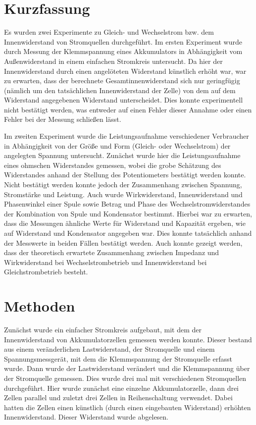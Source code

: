 \documentclass[
	a4paper,
	12pt,
	pagesize,
	ngerman
]{scrartcl}
\begin{document}
	\section{Kurzfassung}
	Es wurden zwei Experimente zu Gleich- und Wechselstrom bzw. dem Innenwiderstand von Stromquellen durchgeführt.
	Im ersten Experiment wurde durch Messung der Klemmspannung eines Akkumulators in Abhängigkeit vom Außenwiderstand in einem einfachen Stromkreis untersucht.
	Da hier der Innenwiderstand durch einen angelöteten Widerstand künstlich erhöht war, war zu erwarten, dass der berechnete Gesamtinnenwiderstand sich nur geringfügig (nämlich um den tatsächlichen Innenwiderstand der Zelle) von dem auf dem Widerstand angegebenen Widerstand unterscheidet.
	Dies konnte experimentell nicht bestätigt werden, was entweder auf einen Fehler dieser Annahme oder einen Fehler bei der Messung schließen lässt.
	\par 
	Im zweiten Experiment wurde die Leistungsaufnahme verschiedener Verbraucher in Abhängigkeit von der Größe und Form (Gleich- oder Wechselstrom) der angelegten Spannung untersucht.
	Zunächst wurde hier die Leistungsaufnahme eines ohmschen Widerstandes gemessen, wobei die grobe Schätzung des Widerstandes anhand der Stellung des Potentiometers bestätigt werden konnte.
	Nicht bestätigt werden konnte jedoch der Zusammenhang zwischen Spannung, Stromstärke und Leistung.
	Auch wurde Wirkwiderstand, Innenwiderstand und Phasenwinkel einer Spule sowie Betrag und Phase des Wechselstromwiderstandes der Kombination von Spule und Kondensator bestimmt.
	Hierbei war zu erwarten, dass die Messungen ähnliche Werte für Widerstand und Kapazität ergeben, wie auf Widerstand und Kondensator angegeben war.
	Dies konnte tatsächlich anhand der Messwerte in beiden Fällen bestätigt werden.
	Auch konnte gezeigt werden, dass der theoretisch erwartete Zusammenhang zwischen Impedanz und Wirkwiderstand bei Wechselstrombetrieb und Innenwiderstand bei Gleichstrombetrieb besteht.
	
	\section{Methoden}
	Zunächst wurde ein einfacher Stromkreis aufgebaut, mit dem der Innenwiderstand von Akkumulatorzellen gemessen werden konnte.
	Dieser bestand aus einem veränderlichen Lastwiderstand, der Stromquelle und einem Spannungsmessgerät, mit dem die Klemmspannung der Stromquelle erfasst wurde.
	Dann wurde der Lastwiderstand verändert und die Klemmspannung über der Stromquelle gemessen.
	Dies wurde drei mal mit verschiedenen Stromquellen durchgeführt.
	Hier wurde zunächst eine einzelne Akkumulatorzelle, dann drei Zellen parallel und zuletzt drei Zellen in Reihenschaltung verwendet.
	Dabei hatten die Zellen einen künstlich (durch einen eingebauten Widerstand) erhöhten Innenwiderstand.
	Dieser Widerstand wurde abgelesen.
	\par
	
\end{document}
